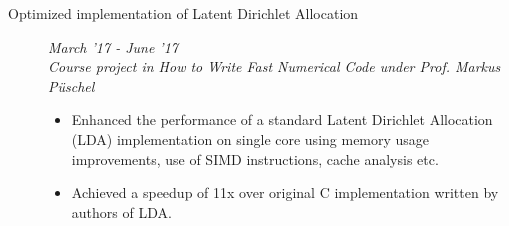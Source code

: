 \documentclass[9pt]{article}
\newenvironment{changemargin}[2]{%
  \begin{list}{}{%
      \setlength{\topsep}{0pt}%
    \setlength{\leftmargin}{#1}%
    \setlength{\rightmargin}{#2}%
    \setlength{\listparindent}{\parindent}%
  \setlength{\itemindent}{\parindent}%
    \setlength{\parsep}{\parskip}%
    }%
  \item[]}{\end{list}
    }
\newenvironment{body} {
  \vspace*{-16pt}
        \begin{changemargin}{-0.6in}{-0.65in}
        }	
        {\end{changemargin}
}
\begin{document}
\begin{body}
\begin{description}

    \item[\normalsize{Optimized implementation of Latent Dirichlet Allocation}]  \hfill \textit{March '17 - June '17} \\
      \textit{Course project in How to Write Fast Numerical Code under Prof. Markus P{\"u}schel}
      \begin{itemize}
        \item Enhanced the performance of a standard Latent Dirichlet Allocation (LDA)
          implementation on single core using memory usage improvements, use of 
          SIMD instructions, cache analysis etc.
        \item Achieved a speedup of 11x over original C implementation written by authors
          of LDA.
      \end{itemize}



\end{description}
\end{body}
\end{document}
